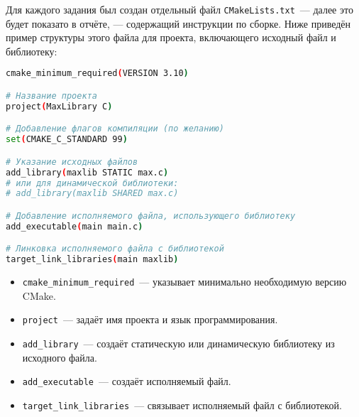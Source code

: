 Для каждого задания был создан отдельный файл \texttt{CMakeLists.txt}~--- далее это будет показато в отчёте, --- содержащий инструкции по сборке. Ниже приведён пример структуры этого файла для проекта, включающего исходный файл и библиотеку:

\begin{lstlisting}[language=bash,caption={Пример структуры CMakeLists.txt}]
cmake_minimum_required(VERSION 3.10)

# Название проекта
project(MaxLibrary C)

# Добавление флагов компиляции (по желанию)
set(CMAKE_C_STANDARD 99)

# Указание исходных файлов
add_library(maxlib STATIC max.c)
# или для динамической библиотеки:
# add_library(maxlib SHARED max.c)

# Добавление исполняемого файла, использующего библиотеку
add_executable(main main.c)

# Линковка исполняемого файла с библиотекой
target_link_libraries(main maxlib)
\end{lstlisting}

\begin{itemize}
  \item \texttt{cmake\_minimum\_required}~--- указывает минимально необходимую версию CMake.
  \item \texttt{project}~--- задаёт имя проекта и язык программирования.
  \item \texttt{add\_library}~--- создаёт статическую или динамическую библиотеку из исходного файла.
  \item \texttt{add\_executable}~--- создаёт исполняемый файл.
  \item \texttt{target\_link\_libraries}~--- связывает исполняемый файл с библиотекой.
\end{itemize}